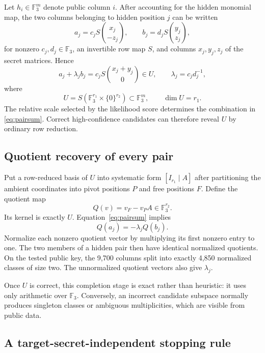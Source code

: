 \documentclass[11pt,a4paper]{article}
\newcommand{\F}{\mathbb{F}}
\begin{document}
Let $h_i\in\F_3^m$ denote public column $i$.  After accounting for the hidden
monomial map, the two columns belonging to hidden position $j$ can be written
\[
 a_j=c_jS\binom{x_j}{-z_j},
 \qquad
 b_j=d_jS\binom{y_j}{z_j},
\]
for nonzero $c_j,d_j\in\F_3$, an invertible row map $S$, and columns
$x_j,y_j,z_j$ of the secret matrices.  Hence
\begin{equation}
 a_j+\lambda_j b_j
   =c_jS\binom{x_j+y_j}{0}
   \in U,
 \qquad
 \lambda_j=c_jd_j^{-1},
 \label{eq:pairsum}
\end{equation}
where
\[
 U=S\left(\F_3^{r_1}\times\{0\}^{r_2}\right)
       \subset\F_3^m,
 \qquad \dim U=r_1.
\]
The relative scale selected by the likelihood score determines the
combination in \eqref{eq:pairsum}.  Correct high-confidence candidates can
therefore reveal $U$ by ordinary row reduction.

\subsection{Quotient recovery of every pair}

Put a row-reduced basis of $U$ into systematic form $[I_{r_1}\mid A]$ after
partitioning the ambient coordinates into pivot positions $P$ and free
positions $F$.  Define the quotient map
\begin{equation}
 Q(v)=v_F-v_PA\in\F_3^{r_2}.
 \label{eq:quotient}
\end{equation}
Its kernel is exactly $U$.  Equation~\eqref{eq:pairsum} implies
\begin{equation}
              Q(a_j)=-\lambda_j Q(b_j).
 \label{eq:qpair}
\end{equation}
Normalize each nonzero quotient vector by multiplying its first nonzero entry
to one.  The two members of a hidden pair then have identical normalized
quotients.  On the tested public key, the 9,700 columns split into exactly
4,850 normalized classes of size two.  The unnormalized quotient vectors
also give $\lambda_j$.

Once $U$ is correct, this completion stage is exact rather than heuristic:
it uses only arithmetic over $\F_3$.  Conversely, an incorrect candidate
subspace normally produces singleton classes or ambiguous multiplicities,
which are visible from public data.

\subsection{A target-secret-independent stopping rule}
\end{document}
